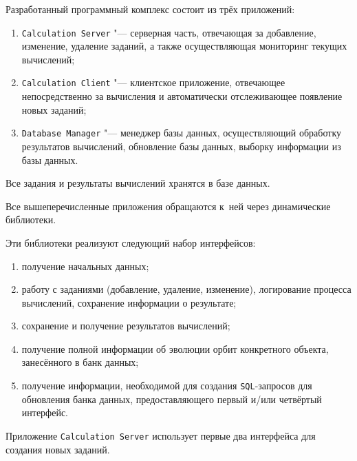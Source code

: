 Разработанный программный комплекс состоит из трёх приложений:

\begin{enumerate}

\item {\tt Calculation Server} "--- серверная часть, отвечающая за добавление, изменение, удаление заданий, а также осуществляющая мониторинг текущих вычислений;

\item {\tt Calculation Client} "--- клиентское приложение, отвечающее непосредственно  за вычисления и автоматически отслеживающее появление новых заданий;

\item {\tt Database Manager} "--- менеджер базы данных, осуществляющий обработку результатов вычислений, обновление базы данных, выборку информации из базы данных.

\end{enumerate}



Все задания и результаты вычислений хранятся в базе данных. 

Все вышеперечисленные приложения обращаются к~ней через динамические библиотеки. 

Эти библиотеки реализуют следующий набор интерфейсов:

\begin{enumerate}

\item получение начальных данных;

\item работу с заданиями (добавление, удаление, изменение), логирование процесса вычислений, сохранение информации о результате;

\item сохранение и получение результатов вычислений;

\item получение полной информации об эволюции орбит конкретного объекта, занесённого в банк данных;

\item получение информации, необходимой для создания {\tt SQL}-запросов для обновления банка данных, предоставляющего первый и/или четвёртый интерфейс.

\end{enumerate}



Приложение {\tt Calculation Server} использует первые два интерфейса для создания новых заданий. 

